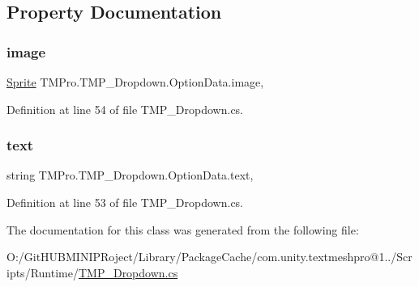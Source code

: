\subsection{Property Documentation}
\mbox{\label{class_t_m_pro_1_1_t_m_p___dropdown_1_1_option_data_ad484ec768284407cd422b47145aa2446}} 
\subsubsection{\texorpdfstring{image}{image}}
{\footnotesize\ttfamily \mbox{\hyperlink{namespace_t_m_pro_ab5662f47179bf1b81c575ecf80b24065a51f2b7b14433aa22c67d1f4fc18943cd}{Sprite}} T\+M\+Pro.\+T\+M\+P\+\_\+\+Dropdown.\+Option\+Data.\+image\hspace{0.3cm}{\ttfamily [get]}, {\ttfamily [set]}}



Definition at line 54 of file T\+M\+P\+\_\+\+Dropdown.\+cs.

\mbox{\label{class_t_m_pro_1_1_t_m_p___dropdown_1_1_option_data_aaa4fe424c6a5503e154e9861e3bfd122}} 
\subsubsection{\texorpdfstring{text}{text}}
{\footnotesize\ttfamily string T\+M\+Pro.\+T\+M\+P\+\_\+\+Dropdown.\+Option\+Data.\+text\hspace{0.3cm}{\ttfamily [get]}, {\ttfamily [set]}}



Definition at line 53 of file T\+M\+P\+\_\+\+Dropdown.\+cs.



The documentation for this class was generated from the following file\+:\begin{DoxyCompactItemize}
\item 
O\+:/\+Git\+H\+U\+B\+M\+I\+N\+I\+P\+Roject/\+Library/\+Package\+Cache/com.\+unity.\+textmeshpro@1../\+Scripts/\+Runtime/\mbox{\hyperlink{_t_m_p___dropdown_8cs}{T\+M\+P\+\_\+\+Dropdown.\+cs}}\end{DoxyCompactItemize}
